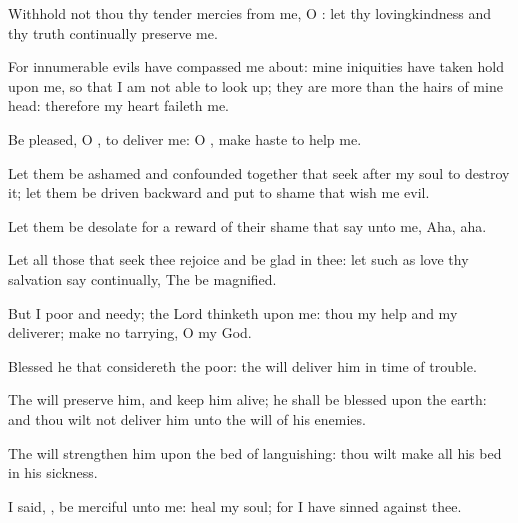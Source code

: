 {\Q {}Withhold not thou thy tender
mercies from me, O
{}: let thy
lovingkindness and thy
truth
continually
preserve me.


\par }{\Q {}For
innumerable
evils have
compassed me about: mine
iniquities have taken
hold upon me, so that I am not
able to look
up; they are
more than the
hairs of mine
head: therefore my
heart
faileth me.


\par }{\Q {}Be
pleased, O
{}, to
deliver me: O
{}, make
haste to
help me.


\par }{\Q {}Let them be
ashamed and
confounded
together that
seek after my
soul to
destroy it; let them be
driven
backward and put to
shame that
wish me
evil.


\par }{\Q {}Let them be
desolate for a
reward of their
shame that
say unto me,
Aha,
aha.


\par }{\Q {}Let all those that
seek thee
rejoice and be
glad in thee: let such as
love thy
salvation
say
continually, The
{} be
magnified.


\par }{\Q {}But I
{}
poor and
needy;
{} the
Lord
thinketh upon me: thou
{} my
help and my
deliverer; make no
tarrying, O my
God.




\par }
{\Q {}Blessed
{} he that
considereth the
poor: the
{} will
deliver him in
time of
trouble.


\par }{\Q {}The
{} will
preserve him, and keep him
alive;
{} he shall be
blessed upon the
earth: and thou wilt not
deliver him unto the
will of his
enemies.


\par }{\Q {}The
{} will
strengthen him upon the
bed of
languishing: thou wilt
make all his
bed in his
sickness.


\par }{\Q {}I
said,
{}, be
merciful unto me:
heal my
soul; for I have
sinned against thee.


\par }{\BB \par }
